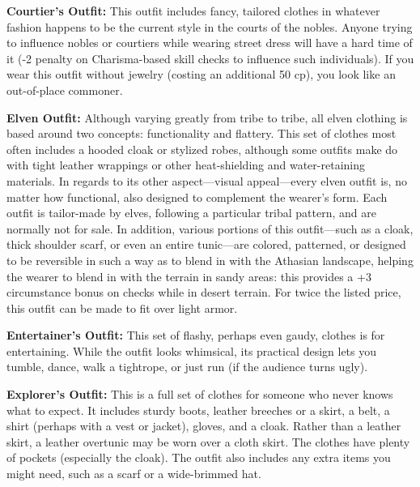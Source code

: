 
\textbf{Courtier's Outfit:} This outfit includes fancy, tailored clothes in whatever fashion happens to be the current style in the courts of the nobles. Anyone trying to influence nobles or courtiers while wearing street dress will have a hard time of it (-2 penalty on Charisma-based skill checks to influence such individuals). If you wear this outfit without jewelry (costing an additional 50 cp), you look like an out-of-place commoner.

\textbf{Elven Outfit:} Although varying greatly from tribe to tribe, all elven clothing is based around two concepts: functionality and flattery. This set of clothes most often includes a hooded cloak or stylized robes, although some outfits make do with tight leather wrappings or other heat-shielding and water-retaining materials. In regards to its other aspect---visual appeal---every elven outfit is, no matter how functional, also designed to complement the wearer's form. Each outfit is tailor-made by elves, following a particular tribal pattern, and are normally not for sale. In addition, various portions of this outfit---such as a cloak, thick shoulder scarf, or even an entire tunic---are colored, patterned, or designed to be reversible in such a way as to blend in with the Athasian landscape, helping the wearer to blend in with the terrain in sandy areas: this provides a +3 circumstance bonus on  checks while in desert terrain. For twice the listed price, this outfit can be made to fit over light armor.

\textbf{Entertainer's Outfit:} This set of flashy, perhaps even gaudy, clothes is for entertaining. While the outfit looks whimsical, its practical design lets you tumble, dance, walk a tightrope, or just run (if the audience turns ugly).

\textbf{Explorer's Outfit:} This is a full set of clothes for someone who never knows what to expect. It includes sturdy boots, leather breeches or a skirt, a belt, a shirt (perhaps with a vest or jacket), gloves, and a cloak. Rather than a leather skirt, a leather overtunic may be worn over a cloth skirt. The clothes have plenty of pockets (especially the cloak). The outfit also includes any extra items you might need, such as a scarf or a wide-brimmed hat.

